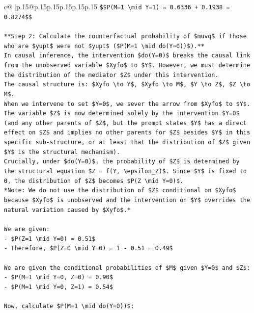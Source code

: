 \documentclass{article}
\begin{document}
{\begin{supertabular}{c@{$\;$}|p{.15\linewidth}@{}p{.15\linewidth}p{.15\linewidth}p{.15\linewidth}p{.15\linewidth}p{.15\linewidth}}
{{{\texttt{\$\$P(M=1 \textbackslash{}mid Y=1) = 0.6336 + 0.1938 = 0.8274\$\$} \\
\\ 
\texttt{**Step 2: Calculate the counterfactual probability of \$muvq\$ if those who are \$yupt\$ were not \$yupt\$ (\$P(M=1 \textbackslash{}mid do(Y=0))\$).**} \\
\texttt{In causal inference, the intervention \$do(Y=0)\$ breaks the causal link from the unobserved variable \$Xyfo\$ to \$Y\$. However, we must determine the distribution of the mediator \$Z\$ under this intervention.} \\
\texttt{The causal structure is: \$Xyfo \textbackslash{}to Y\$, \$Xyfo \textbackslash{}to M\$, \$Y \textbackslash{}to Z\$, \$Z \textbackslash{}to M\$.} \\
\texttt{When we intervene to set \$Y=0\$, we sever the arrow from \$Xyfo\$ to \$Y\$. The variable \$Z\$ is now determined solely by the intervention \$Y=0\$ (and any other parents of \$Z\$, but the prompt states \$Y\$ has a direct effect on \$Z\$ and implies no other parents for \$Z\$ besides \$Y\$ in this specific sub{-}structure, or at least that the distribution of \$Z\$ given \$Y\$ is the structural mechanism).} \\
\texttt{Crucially, under \$do(Y=0)\$, the probability of \$Z\$ is determined by the structural equation \$Z = f(Y, \textbackslash{}epsilon\_Z)\$. Since \$Y\$ is fixed to 0, the distribution of \$Z\$ becomes \$P(Z \textbackslash{}mid Y=0)\$.} \\
\texttt{*Note: We do not use the distribution of \$Z\$ conditional on \$Xyfo\$ because \$Xyfo\$ is unobserved and the intervention on \$Y\$ overrides the natural variation caused by \$Xyfo\$.*} \\
\\ 
\texttt{We are given:} \\
\texttt{{-} \$P(Z=1 \textbackslash{}mid Y=0) = 0.51\$} \\
\texttt{{-} Therefore, \$P(Z=0 \textbackslash{}mid Y=0) = 1 {-} 0.51 = 0.49\$} \\
\\ 
\texttt{We are given the conditional probabilities of \$M\$ given \$Y=0\$ and \$Z\$:} \\
\texttt{{-} \$P(M=1 \textbackslash{}mid Y=0, Z=0) = 0.90\$} \\
\texttt{{-} \$P(M=1 \textbackslash{}mid Y=0, Z=1) = 0.54\$} \\
\\ 
\texttt{Now, calculate \$P(M=1 \textbackslash{}mid do(Y=0))\$:} \\
}}}
\end{supertabular}}
\end{document}
